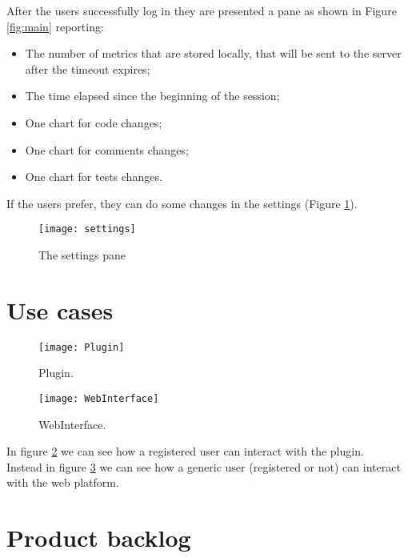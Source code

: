 \documentclass[a4paper,10pt]{report}
\begin{document}
After the users successfully log in they are presented a pane as shown in Figure \ref{fig:main} reporting:

\begin{itemize}
	\item The number of metrics that are stored locally, that will be sent to the server after the timeout expires;
	\item The time elapsed since the beginning of the session;
	\item One chart for code changes;
	\item One chart for comments changes;
	\item One chart for tests changes.
\end{itemize}


\newpage
If the users prefer, they can do some changes in the settings (Figure \ref{fig:settings}).




\begin{figure}[h]
	\centering 
	\texttt{[image: settings]}
	\caption{The settings pane}
	\label{fig:settings}
\end{figure}



\newpage
\section{Use cases} %

\begin{figure}[H]
	\centering
    \texttt{[image: Plugin]}
    \caption{Plugin.}
    \label{fig:plugin}
\end{figure}

\begin{figure}[H]
	\centering
    \texttt{[image: WebInterface]}
    \caption{WebInterface.}
    \label{fig:web}
\end{figure}

In figure \ref{fig:plugin} we can see how a registered user can interact with the plugin.\\
Instead in figure \ref{fig:web} we can see how a generic user (registered or not) can interact with the web platform.\\

\section{Product backlog} %
\end{document}
